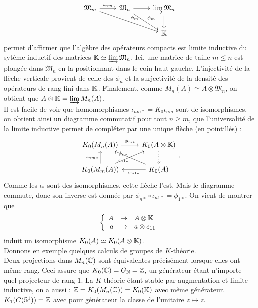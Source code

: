 \[\begin{tikzcd}
\mathfrak M_m \arrow{r}{\iota_{nm}} \arrow{drr}{\phi_m}& \mathfrak M_n \arrow{r} \arrow{dr}{\phi_m}& \varinjlim \mathfrak M_n \arrow{d} \\
				&				& \K
\end{tikzcd}\]
permet d'affirmer que l'algèbre des opérateurs compacts est limite inductive  du sytème inductif des matrices $\mathbb K \simeq \varinjlim \mathfrak M_n$. Ici, une matrice de taille $m\leq n$ est plongée dans $\mathfrak M_n$ en la positionnant dans le coin haut-gauche. L'injectivité de la flèche verticale provient de celle des $\phi_n$ et la surjectivité de la densité des opérateurs de rang fini dans $\mathbb K$. Finalement, comme $M_n(A) \simeq A\otimes \mathfrak M_n$, on obtient que $A\otimes \mathbb K = \varinjlim M_n(A)$.\\
Il est facile de voir que homomorphismes $\iota_{nm*}=K_0\iota_{nm}$ sont de isomorphismes, on obtient ainsi un diagramme commutatif pour tout $n\geq m$, que l'universalité de la limite inductive permet de compléter par une unique flèche (en pointillés) :
\[\begin{tikzcd}K_0(M_n(A)) \arrow{r}{\phi_{m*}}& K_0(A\otimes \K)\arrow[dotted]{d} \\
			K_0(M_m(A)) \arrow{u}{\iota_{nm*}}\arrow{ur}{\phi_{n*}}& K_0(A)   \arrow{l}{\iota_{m1 *}}\arrow{ul }{\iota_{n1*}}
\end{tikzcd}.\]
Comme les $\iota_*$ sont des isomorphismes, cette flèche l'est. Mais le diagramme commute, donc son inverse est donnée par $\phi_{n*}\circ\iota_{n1*}=\phi_{1*}$. On vient de montrer que 
\[\left\{\begin{array}{rcl} A & \rightarrow & A\otimes \mathbb K \\ a &\mapsto & a\otimes e_{11}\end{array}\right.\]
induit un isomorphisme $K_0(A)\simeq K_0(A\otimes \mathbb K)$.\\

Donnons en exemple quelques calculs de groupes de $K$-théorie. \\
Deux projections dans $M_n(\mathbb C)$ sont équivalentes précisément lorsque elles ont même rang. Ceci assure que $K_0(\mathbb C)=G_{\mathbb N}=\mathbb Z$, un générateur étant n'importe quel projecteur de rang $1$. La $K$-théorie étant stable par augmentation et limite inductive, on a aussi : $\mathbb Z=K_0(M_n(\mathbb C))=K_0(\mathbb K)$ avec même générateur. \\
$K_1(C(\mathbb S^1))=\mathbb Z$ avec pour générateur la classe de l'unitaire $z\mapsto \overline z$.\\

